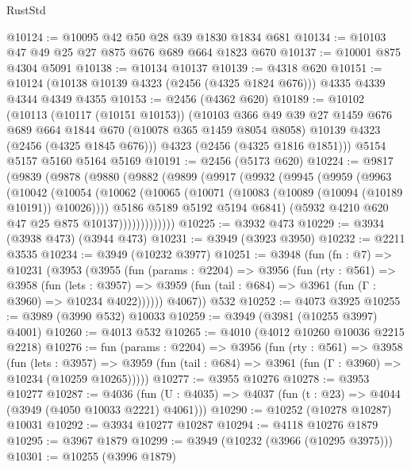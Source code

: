\begin{lexlean}{RustStd}
\begin{coremodule}
@10124 := @10095 @42 @50 @28 @39 @1830 @1834 @681
@10134 := @10103 @47 @49 @25 @27 @875 @676 @689 @664 @1823 @670
@10137 := @10001 @875 @4304 @5091
@10138 := @10134 @10137
@10139 := @4318 @620
@10151 := @10124 (@10138 @10139 @4323 (@2456 (@4325 @1824 @676))) @4335 @4339 @4344 @4349 @4355
@10153 := @2456 (@4362 @620)
@10189 := @10102
    (@10113
      (@10117 (@10151 @10153))
      (@10103
        @366
        @49
        @39
        @27
        @1459
        @676
        @689
        @664
        @1844
        @670
        (@10078 @365 @1459 @8054 @8058)
        @10139
        @4323
        (@2456 (@4325 @1845 @676)))
      @4323
      (@2456 (@4325 @1816 @1851)))
    @5154
    @5157
    @5160
    @5164
    @5169
@10191 := @2456 (@5173 @620)
@10224 := @9817
    (@9839
      (@9878
        (@9880
          (@9882
            (@9899
              (@9917
                (@9932
                  (@9945
                    (@9959
                      (@9963
                        (@10042
                          (@10054
                            (@10062
                              (@10065 (@10071 (@10083 (@10089 (@10094 (@10189 @10191)) @10026))))
                              @5186
                              @5189
                              @5192
                              @5194
                              @6841)
                            (@5932 @4210 @620 @47 @25 @875 @10137)))))))))))))
@10225 := @3932 @473
@10229 := @3934 (@3938 @473) (@3944 @473)
@10231 := @3949 (@3923 @3950)
@10232 := @2211 @3535
@10234 := @3949 (@10232 @3977)
@10251 := @3948
    (fun (fn : @7) =>
    @10231
      (@3953
        (@3955
          (fun (params : @2204) =>
          @3956
            (fun (rty : @561) =>
            @3958
              (fun (lets : @3957) =>
              @3959 (fun (tail : @684) => @3961 (fun (Γ : @3960) => @10234 @4022))))))
        @4067))
    @532
@10252 := @4073 @3925
@10255 := @3989 (@3990 @532) @10033
@10259 := @3949 (@3981 (@10255 @3997) @4001)
@10260 := @4013 @532
@10265 := @4010 (@4012 @10260 @10036 @2215 @2218)
@10276 := fun (params : @2204) =>
  @3956
    (fun (rty : @561) =>
    @3958
      (fun (lets : @3957) =>
      @3959 (fun (tail : @684) => @3961 (fun (Γ : @3960) => @10234 (@10259 @10265)))))
@10277 := @3955 @10276
@10278 := @3953 @10277
@10287 := @4036
    (fun (U : @4035) => @4037 (fun (t : @23) => @4044 (@3949 (@4050 @10033 @2221) @4061)))
@10290 := @10252 (@10278 @10287) @10031
@10292 := @3934 @10277 @10287
@10294 := @4118 @10276 @1879
@10295 := @3967 @1879
@10299 := @3949 (@10232 (@3966 (@10295 @3975)))
@10301 := @10255 (@3996 @1879)

\end{coremodule}
\end{lexlean}
